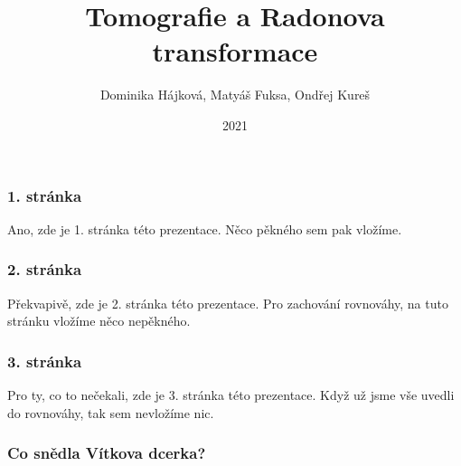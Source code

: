 \documentclass{beamer}
\title{Tomografie a Radonova transformace}
\author{Dominika Hájková, Matyáš Fuksa, Ondřej Kureš}
\institute{Skupina W}
\date{2021}
\begin{document}
\frame{\titlepage}

\begin{frame}
\frametitle{1. stránka}
Ano, zde je 1. stránka této prezentace. Něco pěkného sem pak vložíme.
\end{frame}
\begin{frame}
\frametitle{2. stránka}
Překvapivě, zde je 2. stránka této prezentace. Pro zachování rovnováhy, na tuto stránku vložíme něco nepěkného.
\end{frame}
\begin{frame}
\frametitle{3. stránka}
Pro ty, co to nečekali, zde je 3. stránka této prezentace. Když už jsme vše uvedli do rovnováhy, tak sem nevložíme nic.
\end{frame}

\begin{frame}
\frametitle{Co snědla Vítkova dcerka?}


\end{frame}
\end{document}
